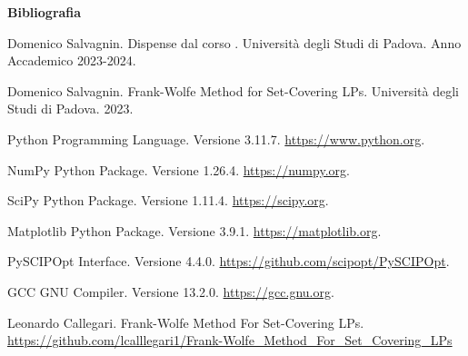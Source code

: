 {
\clearpage
\thispagestyle{empty}
\vspace*{10pt}
\begin{center}
\color{primary}
\fontsize{27pt}{0pt}\bfseries\selectfont\alt Bibliografia
\vspace*{10pt}
\end{center}
}

\begin{enumerate}[label={[\arabic*]}]
    \item Domenico Salvagnin. Dispense dal corso . Università
        degli Studi di Padova. Anno Accademico 2023-2024.
    \item Domenico Salvagnin. Frank-Wolfe Method for Set-Covering LPs. Università degli Studi di Padova. 2023.
    \item Python Programming Language. Versione 3.11.7. \url{https://www.python.org}.
    \item NumPy Python Package. Versione 1.26.4. \url{https://numpy.org}.
    \item SciPy Python Package. Versione 1.11.4. \url{https://scipy.org}.
    \item Matplotlib Python Package. Versione 3.9.1. \url{https://matplotlib.org}.
    \item PySCIPOpt Interface. Versione 4.4.0. \url{https://github.com/scipopt/PySCIPOpt}.
    \item GCC GNU Compiler. Versione 13.2.0. \url{https://gcc.gnu.org}.
    \item Leonardo Callegari. Frank-Wolfe Method For Set-Covering LPs. \\
        \url{https://github.com/lcalllegari1/Frank-Wolfe_Method_For_Set_Covering_LPs}
\end{enumerate}
